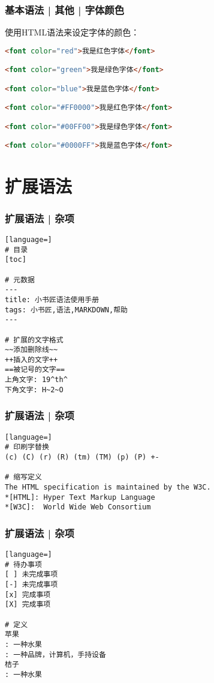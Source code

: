 \begin{frame}[fragile]
  \frametitle{基本语法 | 其他 | 字体颜色}
  使用HTML语法来设定字体的颜色：
\begin{lstlisting}[language=HTML]
<font color="red">我是红色字体</font> 

<font color="green">我是绿色字体</font> 

<font color="blue">我是蓝色字体</font> 

<font color="#FF0000">我是红色字体</font> 

<font color="#00FF00">我是绿色字体</font> 

<font color="#0000FF">我是蓝色字体</font> 
\end{lstlisting}
\end{frame}

\section{扩展语法}
\begin{frame}[fragile]
  \frametitle{扩展语法 | 杂项}
\begin{lstlisting}[language=]
# 目录
[toc]

# 元数据
---
title: 小书匠语法使用手册
tags: 小书匠,语法,MARKDOWN,帮助
--- 

# 扩展的文字格式
~~添加删除线~~
++插入的文字++
==被记号的文字==
上角文字: 19^th^
下角文字: H~2~O
\end{lstlisting}
\end{frame}

\begin{frame}[fragile]
  \frametitle{扩展语法 | 杂项}
\begin{lstlisting}[language=]
# 印刷字替换
(c) (C) (r) (R) (tm) (TM) (p) (P) +-

# 缩写定义
The HTML specification is maintained by the W3C.
*[HTML]: Hyper Text Markup Language
*[W3C]:  World Wide Web Consortium
\end{lstlisting}
\end{frame}

\begin{frame}[fragile]
  \frametitle{扩展语法 | 杂项}
\begin{lstlisting}[language=]
# 待办事项
[ ] 未完成事项
[-] 未完成事项
[x] 完成事项
[X] 完成事项

# 定义
苹果
: 一种水果
: 一种品牌，计算机，手持设备
桔子
: 一种水果
\end{lstlisting}
\end{frame}

